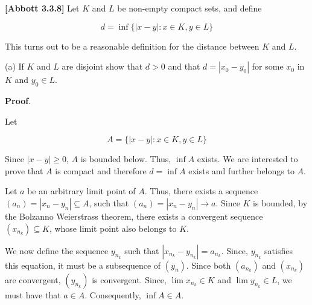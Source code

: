 \documentclass[10pt]{article}
\begin{document}
\textbf{[Abbott 3.3.8] }Let $\displaystyle K$ and $\displaystyle L$ be non-empty compact sets, and define 




\begin{equation*}
d=\inf\{|x-y|:x\in K,y\in L\}
\end{equation*}


This turns out to be a reasonable definition for the distance between $\displaystyle K$ and $\displaystyle L$. 



(a) If $\displaystyle K$ and $\displaystyle L$ are disjoint show that $\displaystyle d >0$ and that $\displaystyle d=|x_{0} -y_{0} |$ for some $\displaystyle x_{0}$ in $\displaystyle K$ and $\displaystyle y_{0} \in L$.

 

\textbf{Proof}.



Let 


\begin{equation*}
A=\{|x-y|:x\in K,y\in L\}
\end{equation*}


Since $\displaystyle |x-y|\geq 0$, $\displaystyle A$ is bounded below. Thus, $\displaystyle \inf A$ exists. We are interested to prove that $\displaystyle A$ is compact and therefore $\displaystyle d=\inf A$ exists and further belongs to $\displaystyle A$.



Let $\displaystyle a$ be an arbitrary limit point of $\displaystyle A$. Thus, there exists a sequence $\displaystyle ( a_{n}) =|x_{n} -y_{n} |\subseteq A$, such that $\displaystyle ( a_{n}) =|x_{n} -y_{n} |\rightarrow a$. Since $\displaystyle K$ is bounded, by the Bolzanno Weierstrass theorem, there exists a convergent sequence $\displaystyle ( x_{n_{k}}) \subseteq K$, whose limit point also belongs to $\displaystyle K$. 



We now define the sequence $\displaystyle y_{n_{k}}$ such that $\displaystyle |x_{n_{k}} -y_{n_{k}} |=a_{n_{k}}$. Since, $\displaystyle y_{n_{k}}$ satisfies this equation, it must be a subsequence of $\displaystyle ( y_{n})$. Since both $\displaystyle ( a_{n_{k}})$ and $\displaystyle ( x_{n_{k}})$ are convergent, $\displaystyle ( y_{n_{k}})$ is convergent. Since, $\displaystyle \lim x_{n_{k}} \in K$ and $\displaystyle \lim y_{n_{k}} \in L$, we must have that $\displaystyle a\in A$. Consequently, $\displaystyle \inf A\in A$.
\end{document}
